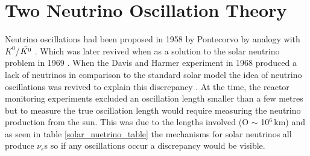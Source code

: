 \section{Two Neutrino Oscillation Theory} \label{section_neutrino_oscillations}
Neutrino oscillations had been proposed in 1958 by Pontecorvo by analogy with $K^0$/$\Bar{K^0}$  \cite{griffiths2008book} \cite{griffiths2008neutrinoOscillations} \cite{pontecorvo1958_OscillationProposal}. Which was later revived when as a solution to the solar neutrino problem in 1969 \cite{pontecorvo_gibov_1969_solar_oscillation}. When the Davis and Harmer experiment in 1968 produced a lack of neutrinos in comparison to the standard solar model the idea of neutrino oscillations was revived to explain this discrepancy \cite{pontecorvo_gibov_1969_solar_oscillation}. At the time, the reactor monitoring experiments excluded an oscillation length smaller than a few metres but to measure the true oscillation length would require measuring the neutrino production from the sun. This was due to the lengths involved (O $\sim$ 10$^6$\,km) \cite{pontecorvo_gibov_1969_solar_oscillation} and as seen in table \ref{solar_nuetrino_table} the mechanisms for solar neutrinos all produce $\nu_e$s so if any oscillations occur a discrepancy would be visible. 
